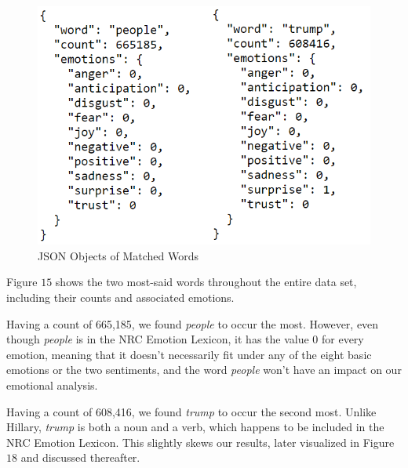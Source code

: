 \documentclass[letterpaper]{article}
\begin{document}
\begin{figure}[!htb]
\begin{center}
\includegraphics[scale=0.9]{topTwoWordsWithEmotion.png}
\caption{JSON Objects of Matched Words}
\label{fig1}
\end{center}
\end{figure}

Figure $15$ shows the two most-said words throughout the entire data set, including their counts and associated emotions.

Having a count of 665,185, we found \textit{people} to occur the most. However, even though \textit{people} is in the NRC Emotion Lexicon, it has the value $0$ for every emotion, meaning that it doesn't necessarily fit under any of the eight basic emotions or the two sentiments, and the word \textit{people} won't have an impact on our emotional analysis.

Having a count of 608,416, we found \textit{trump} to occur the second most. Unlike Hillary, \textit{trump} is both a noun and a verb, which happens to be included in the NRC Emotion Lexicon. This slightly skews our results, later visualized in Figure $18$ and discussed thereafter.
\end{document}
